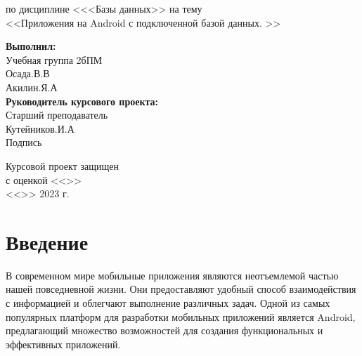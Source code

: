 \documentclass[12pt]{article}
\begin{document}
\begin{titlepage}
\begin{center}
            по дисциплине <<<Базы данных>>
            на тему\\
            <<Приложения на Android с подключенной базой данных. >>
        \end{center}

        \hfill \begin{minipage}{0.5\linewidth}
                   \textbf{Выполнил:}\\
                   Учебная группа 2бПМ\\
                   Осада.В.В\\
                   Акилин.Я.А\\
                   \textbf{Руководитель курсового проекта:
                   }\\
                   Старший преподаватель\\
                   Кутейников.И.А\\
                   Подпись \underline{\hspace{1cm}}\\
        \end{minipage}
        \vspace{1 cm}
        \begin{minipage}{0.45\linewidth}
            Курсовой проект защищен\\ с оценкой <<\underline{\hspace{1cm}}>>\\
            <<\underline{\hspace{0.7cm}}>> \underline{\hspace{2cm}} 2023 г.
        \end{minipage}
        \begin{minipage}{0.55\linewidth}
        \end{minipage}
        \vspace{5 cm}
    \end{titlepage}

    \tableofcontents
    \newpage

    \section{Введение}
    В современном мире мобильные приложения являются неотъемлемой частью нашей повседневной жизни. Они предоставляют удобный способ взаимодействия с информацией и облегчают выполнение различных задач. Одной из самых популярных платформ для разработки мобильных приложений является Android, предлагающий множество возможностей для создания функциональных и эффективных приложений.
\end{document}
